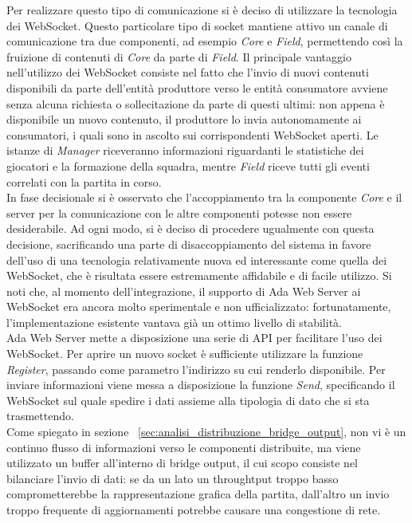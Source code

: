 Per realizzare questo tipo di comunicazione si è deciso di utilizzare la tecnologia dei WebSocket. Questo particolare tipo di socket mantiene attivo un canale di comunicazione tra due componenti, ad esempio \emph{Core} e \emph{Field}, permettendo così la fruizione di contenuti di \emph{Core} da parte di \emph{Field}. Il principale vantaggio nell'utilizzo dei WebSocket consiste nel fatto che l'invio di nuovi contenuti disponibili da parte dell'entità produttore verso le entità consumatore avviene senza alcuna richiesta o sollecitazione da parte di questi ultimi: non appena è disponibile un nuovo contenuto, il produttore lo invia autonomamente ai consumatori, i quali sono in ascolto sui corrispondenti WebSocket aperti. Le istanze di \emph{Manager} riceveranno informazioni riguardanti le statistiche dei giocatori e la formazione della squadra, mentre \emph{Field} riceve tutti gli eventi correlati con la partita in corso.\\

In fase decisionale si è osservato che l'accoppiamento tra la componente \emph{Core} e il server per la comunicazione con le altre componenti potesse non essere desiderabile. Ad ogni modo, si è deciso di procedere ugualmente con questa decisione, sacrificando una parte di disaccoppiamento del sistema in favore dell'uso di una tecnologia relativamente nuova ed interessante come quella dei WebSocket, che è risultata essere estremamente affidabile e di facile utilizzo. Si noti che, al momento dell'integrazione, il supporto di Ada Web Server ai WebSocket era ancora molto sperimentale e non ufficializzato: fortunatamente, l'implementazione esistente vantava già un ottimo livello di stabilità.\\

Ada Web Server mette a disposizione una serie di API per facilitare l'uso dei WebSocket. Per aprire un nuovo socket è sufficiente utilizzare la funzione \emph{Register}, passando come parametro l'indirizzo su cui renderlo disponibile. Per inviare informazioni viene messa a disposizione la funzione \emph{Send}, specificando il WebSocket sul quale spedire i dati assieme alla tipologia di dato che si sta trasmettendo.\\

Come spiegato in sezione ~\ref{sec:analisi_distribuzione_bridge_output}, non vi è un continuo flusso di informazioni verso le componenti distribuite, ma viene utilizzato un buffer all'interno di bridge output, il cui scopo consiste nel bilanciare l'invio di dati: se da un lato un throughtput troppo basso comprometterebbe la rappresentazione grafica della partita, dall'altro un invio troppo frequente di aggiornamenti potrebbe causare una congestione di rete.


